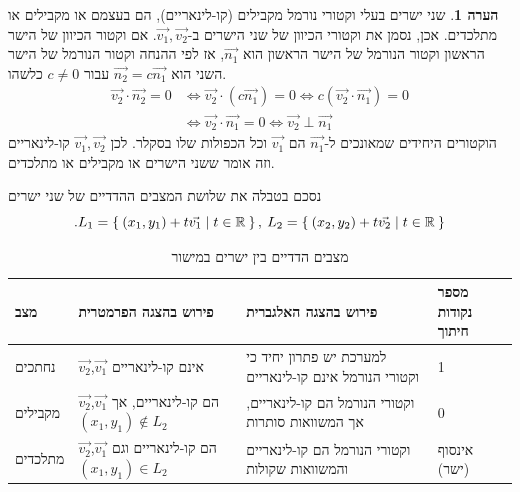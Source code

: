 \documentclass[12pt]{report}
\theoremstyle{plain}
\theoremstyle{definition}
\newtheorem{remark}{הערה}[chapter]
\newcommand{\R}{\mathbb{R}}
\newcommand{\0}{\mathbf{0}}
\begin{document}
\begin{remark}
שני ישרים בעלי וקטורי נורמל מקבילים (קו-לינאריים), הם בעצמם
או מקבילים או מתלכדים. אכן, נסמן את וקטורי הכיוון של שני הישרים ב-$\vec{v_1},\vec{v_2}$.
אם וקטור הכיוון של הישר הראשון וקטור הנורמל של הישר הראשון הוא $\vec{n_1}$,
אז לפי ההנחה וקטור הנורמל של הישר השני הוא $\vec{n_2}=c\vec{n_1}$
עבור $c\neq0$ כלשהו.
\begin{align*}
\vec{v_2}\cdot\vec{n_2}=0&\iff\vec{v_2}\cdot(c\vec{n_1})=0\iff c(\vec{v_2}\cdot\vec{n_1})=0\\
&\iff\vec{v_2}\cdot\vec{n_1}=0\iff\vec{v_2}\perp\vec{n_1}	
\end{align*}
הוקטורים היחידים שמאונכים ל-$\vec{n_1}$ הם $\vec{v_1}$
וכל הכפולות שלו בסקלר. לכן $\vec{v_1},\vec{v_2}$ קו-לינאריים
וזה אומר ששני הישרים או מקבילים או מתלכדים.
\end{remark}

נסכם בטבלה את שלושת המצבים ההדדיים של שני ישרים 
$$	
	.L_1=\Set{(x_1,y_1)+t\vec{v_1}|t\in\R},\:L_2=\Set{(x_2,y_2)+t\vec{v_2}|t\in\R}	
$$

\begin{table}[H]
\centering
\caption{\texthebrew{מצבים הדדיים בין ישרים במישור}}
\begin{tabular}{|>{\raggedleft\arraybackslash}p{2.5cm}|>{\raggedleft\arraybackslash}p{3cm}|>{\raggedleft\arraybackslash}p{3cm}|>{\raggedleft\arraybackslash}p{2.5cm}|}
\hline
\texthebrew{\textbf{מצב}} & \texthebrew{\textbf{פירוש בהצגה הפרמטרית}} & \texthebrew{\textbf{פירוש בהצגה האלגברית}} & \texthebrew{\textbf{מספר נקודות חיתוך}} \\ \hline
\texthebrew{נחתכים} & \texthebrew{$\vec{v_2}$,$\vec{v_1}$ אינם קו-לינאריים} & \texthebrew{למערכת יש פתרון יחיד כי וקטורי הנורמל אינם קו-לינאריים} & \texthebrew{1} \\ \hline
\texthebrew{מקבילים} & \texthebrew{$\vec{v_2}$,$\vec{v_1}$ הם קו-לינאריים, אך $(x_1,y_1)\notin L_2$} & \texthebrew{וקטורי הנורמל הם קו-לינאריים, אך המשוואות סותרות} & \texthebrew{0} \\ \hline
\texthebrew{מתלכדים} & \texthebrew{$\vec{v_2}$,$\vec{v_1}$ הם קו-לינאריים וגם $(x_1,y_1)\in L_2$} & \texthebrew{וקטורי הנורמל הם קו-לינאריים והמשוואות שקולות} & \texthebrew{אינסוף (ישר)} \\ \hline
\end{tabular}
\end{table}
\end{document}
